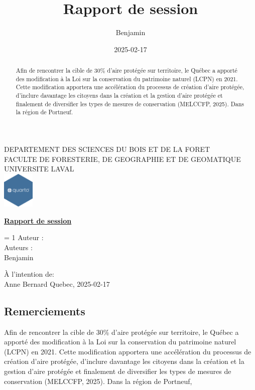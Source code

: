 \documentclass[
  12pt,
]{article}
\title{Rapport de session}
\author{Benjamin}
\date{2025-02-17}
\begin{document}
  
  \begin{titlepage} 
      \centering
      {\large DEPARTEMENT DES SCIENCES DU BOIS ET DE LA FORET \\}
      {\large FACULTE DE FORESTERIE, DE GEOGRAPHIE ET DE GEOMATIQUE \\}
      {\large UNIVERSITE LAVAL \\}
      {\includegraphics[width=1.5cm]{logo-quarto} \\}
      \vspace{2cm}
      {\Huge\bfseries\underline {Rapport de session} \par}
      \vspace{2cm}

               = 1
              {\Large Auteur : \\}
          \else
              {\Large Auteurs : \\}
          \fi
          {\large {Benjamin}}
      
      \vfill
      {\Large À l'intention de: \\ {Anne Bernard}}
      \vfill
      {\large Quebec, {2025-02-17}}
  \end{titlepage}

  \renewcommand{\abstractname}{\section{Résumé}\label{ruxe9sumuxe9}}
  \begin{abstract}
    \begin{center}
      Afin de rencontrer la cible de 30\% d'aire protégée sur
      territoire, le Québec a apporté des modification à la Loi sur la
      conservation du patrimoine naturel (LCPN) en 2021. Cette
      modification apportera une accélération du processus de création
      d'aire protégée, d'inclure davantage les citoyens dans la création
      et la gestion d'aire protégée et finalement de diversifier les
      types de mesures de conservation (MELCCFP, 2025). Dans la région
      de Portneuf.
    \end{center}
    {\newpage}
  \end{abstract}

  \begin{center}
    \section{Remerciements}\label{remerciement}
    Afin de rencontrer la cible de 30\% d'aire protégée sur territoire,
    le Québec a apporté des modification à la Loi sur la conservation du
    patrimoine naturel (LCPN) en 2021. Cette modification apportera une
    accélération du processus de création d'aire protégée, d'inclure
    davantage les citoyens dans la création et la gestion d'aire
    protégée et finalement de diversifier les types de mesures de
    conservation (MELCCFP, 2025). Dans la région de Portneuf,
  \end{center}
  {\newpage}
\end{document}
